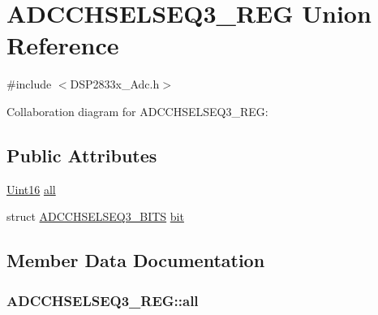 \hypertarget{union_a_d_c_c_h_s_e_l_s_e_q3___r_e_g}{}\section{A\+D\+C\+C\+H\+S\+E\+L\+S\+E\+Q3\+\_\+\+R\+E\+G Union Reference}
\label{union_a_d_c_c_h_s_e_l_s_e_q3___r_e_g}


{\ttfamily \#include $<$D\+S\+P2833x\+\_\+\+Adc.\+h$>$}



Collaboration diagram for A\+D\+C\+C\+H\+S\+E\+L\+S\+E\+Q3\+\_\+\+R\+E\+G\+:
\subsection*{Public Attributes}
\begin{DoxyCompactItemize}
\item 
\hyperlink{_d_s_p2833x___device_8h_a59a9f6be4562c327cbfb4f7e8e18f08b}{Uint16} \hyperlink{union_a_d_c_c_h_s_e_l_s_e_q3___r_e_g_a6c15dc36671228844237980df102c23c}{all}
\item 
struct \hyperlink{struct_a_d_c_c_h_s_e_l_s_e_q3___b_i_t_s}{A\+D\+C\+C\+H\+S\+E\+L\+S\+E\+Q3\+\_\+\+B\+I\+T\+S} \hyperlink{union_a_d_c_c_h_s_e_l_s_e_q3___r_e_g_a888a92221932e871c156a32437761e12}{bit}
\end{DoxyCompactItemize}


\subsection{Member Data Documentation}
\hypertarget{union_a_d_c_c_h_s_e_l_s_e_q3___r_e_g_a6c15dc36671228844237980df102c23c}{}
\subsubsection[{all}]{ A\+D\+C\+C\+H\+S\+E\+L\+S\+E\+Q3\+\_\+\+R\+E\+G\+::all}\label{union_a_d_c_c_h_s_e_l_s_e_q3___r_e_g_a6c15dc36671228844237980df102c23c}
\hypertarget{union_a_d_c_c_h_s_e_l_s_e_q3___r_e_g_a888a92221932e871c156a32437761e12}{}
